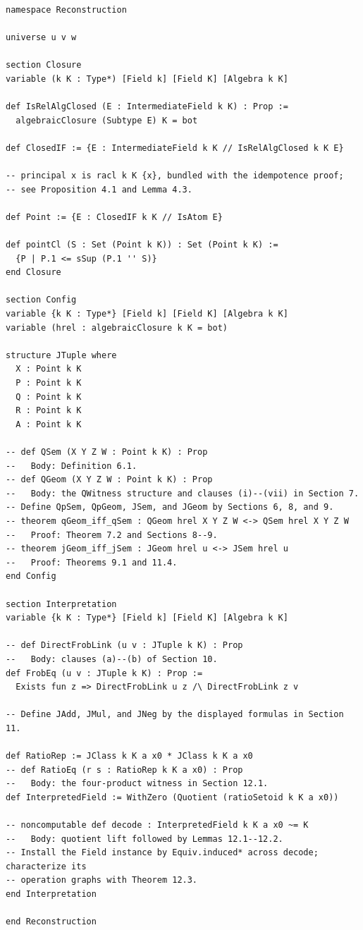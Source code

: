 \documentclass[11pt,oneside]{article}
\theoremstyle{definition}
\theoremstyle{remark}
\begin{document}
\begin{lstlisting}
namespace Reconstruction

universe u v w

section Closure
variable (k K : Type*) [Field k] [Field K] [Algebra k K]

def IsRelAlgClosed (E : IntermediateField k K) : Prop :=
  algebraicClosure (Subtype E) K = bot

def ClosedIF := {E : IntermediateField k K // IsRelAlgClosed k K E}

-- principal x is racl k K {x}, bundled with the idempotence proof;
-- see Proposition 4.1 and Lemma 4.3.

def Point := {E : ClosedIF k K // IsAtom E}

def pointCl (S : Set (Point k K)) : Set (Point k K) :=
  {P | P.1 <= sSup (P.1 '' S)}
end Closure

section Config
variable {k K : Type*} [Field k] [Field K] [Algebra k K]
variable (hrel : algebraicClosure k K = bot)

structure JTuple where
  X : Point k K
  P : Point k K
  Q : Point k K
  R : Point k K
  A : Point k K

-- def QSem (X Y Z W : Point k K) : Prop
--   Body: Definition 6.1.
-- def QGeom (X Y Z W : Point k K) : Prop
--   Body: the QWitness structure and clauses (i)--(vii) in Section 7.
-- Define QpSem, QpGeom, JSem, and JGeom by Sections 6, 8, and 9.
-- theorem qGeom_iff_qSem : QGeom hrel X Y Z W <-> QSem hrel X Y Z W
--   Proof: Theorem 7.2 and Sections 8--9.
-- theorem jGeom_iff_jSem : JGeom hrel u <-> JSem hrel u
--   Proof: Theorems 9.1 and 11.4.
end Config

section Interpretation
variable {k K : Type*} [Field k] [Field K] [Algebra k K]

-- def DirectFrobLink (u v : JTuple k K) : Prop
--   Body: clauses (a)--(b) of Section 10.
def FrobEq (u v : JTuple k K) : Prop :=
  Exists fun z => DirectFrobLink u z /\ DirectFrobLink z v

-- Define JAdd, JMul, and JNeg by the displayed formulas in Section 11.

def RatioRep := JClass k K a x0 * JClass k K a x0
-- def RatioEq (r s : RatioRep k K a x0) : Prop
--   Body: the four-product witness in Section 12.1.
def InterpretedField := WithZero (Quotient (ratioSetoid k K a x0))

-- noncomputable def decode : InterpretedField k K a x0 ~= K
--   Body: quotient lift followed by Lemmas 12.1--12.2.
-- Install the Field instance by Equiv.induced* across decode; characterize its
-- operation graphs with Theorem 12.3.
end Interpretation

end Reconstruction
\end{lstlisting}
\end{document}
